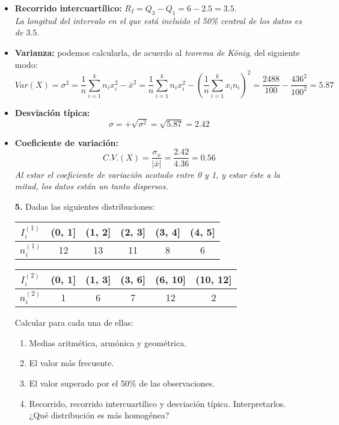 \documentclass[11pt,a4paper]{article}
\theoremstyle{definition}
\begin{document}
\begin{enumerate}[label=\emph{\alph*})]
\begin{itemize}
		\item \textbf{Recorrido intercuartílico:} $R_I = Q_3 - Q_1 = 6-2.5 = 3.5$. \\
		\emph{La longitud del intervalo en el que está incluido el 50\% central de los datos es de $3.5$.}
		\item \textbf{Varianza:} podemos calcularla, de acuerdo al \emph{teorema de König}, del siguiente modo:
		$$ Var(X) = \sigma^2 = \frac{1}{n}\sum_{i=1}^{k}n_ix_i^2 - \bar{x}^2 = \frac{1}{n} \sum_{i=1}^{k}n_ix_i^2 - \left(  \frac{1}{n}\sum_{i=1}^{k}x_{i}n_{i} \right)^2 = \frac{2488}{100} - \frac{436^2}{100^2} = 5.87 $$
		\item \textbf{Desviación típica:}
				$$ \sigma = +\sqrt{\sigma^2} = \sqrt{5.87} = 2.42$$
		\item \textbf{Coeficiente de variación:}
		$$ C.V.(X) = \frac{\sigma_x}{|\bar{x}|} = \frac{2.42}{4.36} = 0.56 $$
		\emph{Al estar el coeficiente de variación acotado entre 0 y 1, y estar éste a la mitad, los datos están un tanto dispersos.}
	\end{itemize}
		\emph{}
\end{enumerate}




\pagebreak

\begin{itemize}
	\item[\textbf{5.}] Dadas las siguientes distribuciones:


\begin{table}[!htbp]
\hspace{2cm}
\begin{tabular}{|c|c|c|c|c|c|}
\hline
$I^{(1)}_i$ & (0, 1] & (1, 2] & (2, 3] & (3, 4] & (4, 5] \\ \hline
$n^{(1)}_i$ & 12 & 13 & 11 & 8 & 6 \\ \hline
\end{tabular}
\end{table}
\begin{table}[!htbp]
\hspace{2cm}
\begin{tabular}{|c|c|c|c|c|c|}
\hline
$I^{(2)}_i$ & (0, 1] & (1, 3] & (3, 6] & (6, 10] & (10, 12] \\ \hline
$n^{(2)}_i$ & 1 & 6 & 7 & 12 & 2 \\ \hline
\end{tabular}
\end{table}
Calcular para cada una de ellas:
	\begin{enumerate}[label=\emph{\alph*})]
		\item Medias aritmética, armónica y geométrica.
		\item El valor más frecuente.
		\item El valor superado por el 50\% de las observaciones.
		\item Recorrido, recorrido intercuartílico y desviación típica. Interpretarlos. ¿Qué distribución es más homogénea?
	\end{enumerate}
\end{itemize}
\end{document}
